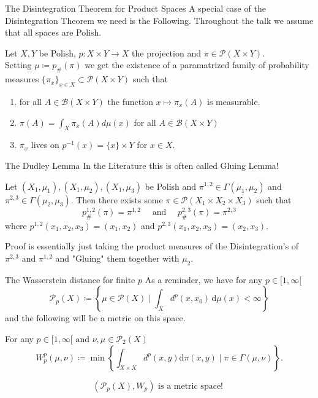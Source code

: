 \documentclass[10pt]{beamer}
\begin{document}


\begin{frame}{The Disintegration Theorem for Product Spaces}
    A special case of the Disintegration Theorem we need is the Following. Throughout the talk we assume that all spaces are Polish. 
    \begin{theorem}
        Let $X,Y$ be Polish, $p : X \times Y \rightarrow X$ the projection and $\pi \in \mathcal{P}(X \times Y)$. \\ 
        Setting $\mu \coloneqq p_{\#}(\pi)$ we get the existence of a paramatrized family of probability measures $\{\pi_x\}_{x \in X} \subset \mathcal{P}(X \times Y)$ such that
        \begin{enumerate}
            \item for all $A \in \mathcal{B}(X \times Y)$ the function $x \mapsto \pi_x(A)$ is measurable.
            \item $\pi(A) = \int_X \pi_x(A) d\mu(x)$ for all $A \in \mathcal{B}(X \times Y)$
            \item $\pi_x$ lives on $p^{-1}(x) = \{x\} \times Y$ for $x \in X.$
         \end{enumerate} 
    \end{theorem}
\end{frame}

\begin{frame}{The Dudley Lemma}
    In the Literature this is often called Gluing Lemma!

    \begin{lemma}
        Let $(X_1,\mu_1), (X_1,\mu_2),(X_1,\mu_3)$ be Polish and $\pi^{1,2} \in \Gamma(\mu_1,\mu_2)$ and $\pi^{2,3} \in \Gamma(\mu_2,\mu_3)$. 
        Then there exists some $\pi \in \mathcal{P}(X_1 \times X_2 \times X_3)$ such that $$p_{\#}^{1,2}(\pi) = \pi^{1,2} \quad \text{ and } \quad p_{\#}^{2,3}(\pi) = \pi^{2,3}$$ where $p^{1,2}(x_1,x_2,x_3) = (x_1,x_2)$ and $p^{2,3}(x_1,x_2,x_3) = (x_2,x_3).$ 
    \end{lemma}

    Proof is essentially just taking the product measures of the Disintegration's of $\pi^{2,3}$ and $\pi^{1,2}$ and "Gluing" them together with $\mu_2$. 
\end{frame}


\begin{frame}{The Wasserstein distance for finite $p$} 
    As a reminder, we have for any $p \in [1,\infty[$
    $$\mathcal{P}_p(X) \coloneqq \left\{\mu \in \mathcal{P}(X) \mid \int_X d^p(x, x_0) \, \mathrm{d}\mu(x) < \infty \right\}$$ and the following will be a metric on this space. 
    \begin{definition}
        For any $p \in [1,\infty[$ and $\nu,\mu \in \mathcal{P}_2(X)$
        $$W_p^p(\mu,\nu) \coloneqq \min \left\{\int_{X\times X}d^p(x,y)\mathrm{d}\pi(x,y) \mid \pi\in\Gamma(\mu,\nu)\right\}.$$
    \end{definition}
    \begin{theorem}
        $$(\mathcal{P}_p(X), W_p) \text{ is a metric space! }$$
    \end{theorem}
\end{frame}
\end{document}
